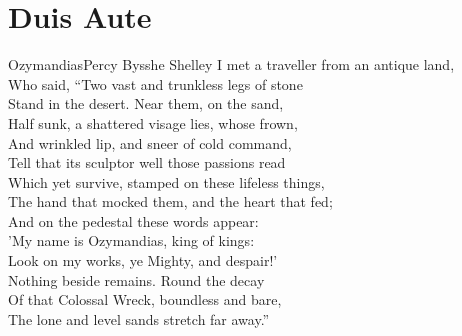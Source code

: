 \documentclass[../main.tex]{subfiles}
\begin{document}
	\chapter{Duis Aute}

	\begin{poem*}{Ozymandias}{Percy Bysshe Shelley}
		I met a traveller from an antique land, \\
		Who said, ``Two vast and trunkless legs of stone \\
		Stand in the desert. Near them, on the sand, \\
		Half sunk, a shattered visage lies, whose frown,\\
		And wrinkled lip, and sneer of cold command,\\
		Tell that its sculptor well those passions read\\
		Which yet survive, stamped on these lifeless things,\\
		The hand that mocked them, and the heart that fed;\\
		And on the pedestal these words appear:\\
		'My name is Ozymandias, king of kings:\\
		Look on my works, ye Mighty, and despair!'\\
		Nothing beside remains. Round the decay\\
		Of that Colossal Wreck, boundless and bare,\\
		The lone and level sands stretch far away.''\\
	\end{poem*}
	
\end{document}
